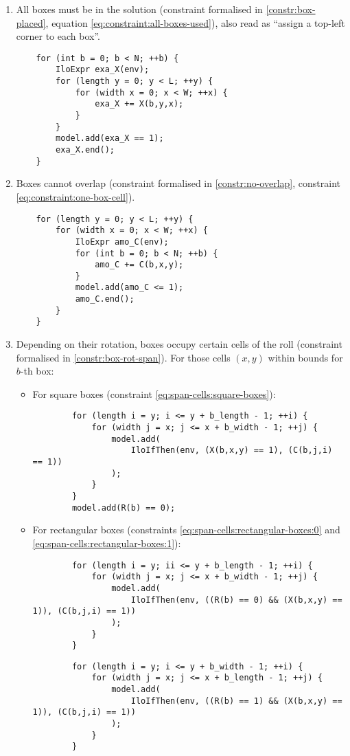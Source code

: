 \begin{enumerate}
	\item All boxes must be in the solution (constraint formalised in
	\ref{constr:box-placed}, equation \ref{eq:constraint:all-boxes-used}),
	also read as ``assign a top-left corner to each box''.
    
	{\NOINDENT \begin{lstlisting}
	for (int b = 0; b < N; ++b) {
		IloExpr exa_X(env);
		for (length y = 0; y < L; ++y) {
			for (width x = 0; x < W; ++x) {
				exa_X += X(b,y,x);
			}
		}
		model.add(exa_X == 1);
		exa_X.end();
	}
	\end{lstlisting}}
    
	\item Boxes cannot overlap (constraint formalised in
	\ref{constr:no-overlap}, constraint \ref{eq:constraint:one-box-cell}).
    
	{\NOINDENT \begin{lstlisting}
	for (length y = 0; y < L; ++y) {
		for (width x = 0; x < W; ++x) {
			IloExpr amo_C(env);
			for (int b = 0; b < N; ++b) {
				amo_C += C(b,x,y);
			}
			model.add(amo_C <= 1);
			amo_C.end();
		}
	}
	\end{lstlisting}}
    
	\item Depending on their rotation, boxes occupy certain cells of the roll
	(constraint formalised in \ref{constr:box-rot-span}). For those cells $(x,y)$ within
	bounds for $b$-th box:

	\begin{itemize}
		\item For square boxes (constraint \ref{eq:span-cells:square-boxes}):
		{\NOINDENT \begin{lstlisting}
		for (length i = y; i <= y + b_length - 1; ++i) {
			for (width j = x; j <= x + b_width - 1; ++j) {
				model.add(
					IloIfThen(env, (X(b,x,y) == 1), (C(b,j,i) == 1))
				);
			}
		}
		model.add(R(b) == 0);
		\end{lstlisting}}
		
		\item For rectangular boxes (constraints \ref{eq:span-cells:rectangular-boxes:0} and
		\ref{eq:span-cells:rectangular-boxes:1}):
		{\NOINDENT \begin{lstlisting}
		for (length i = y; ii <= y + b_length - 1; ++i) {
			for (width j = x; j <= x + b_width - 1; ++j) {
				model.add(
					IloIfThen(env, ((R(b) == 0) && (X(b,x,y) == 1)), (C(b,j,i) == 1))
				);
			}
		}
		\end{lstlisting}}
		{\NOINDENT \begin{lstlisting}
		for (length i = y; i <= y + b_width - 1; ++i) {
			for (width j = x; j <= x + b_length - 1; ++j) {
				model.add(
					IloIfThen(env, ((R(b) == 1) && (X(b,x,y) == 1)), (C(b,j,i) == 1))
				);
			}
		}
		\end{lstlisting}}
	\end{itemize}
    

\end{enumerate}
